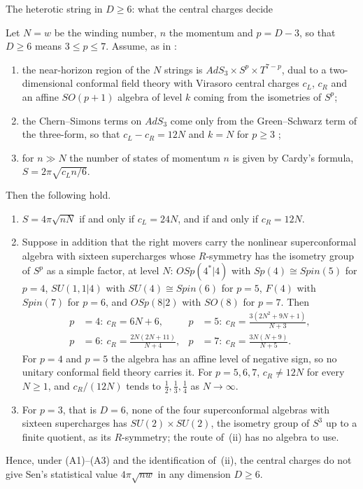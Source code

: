 \begin{closurebox}{The heterotic string in $D\ge6$: what the central charges decide}
\begin{theorem}\label{thm:centralcharge}
Let $N=w$ be the winding number, $n$ the momentum and $p=D-3$, so that $D\ge6$ means $3\le p\le7$. Assume, as in \cite{DM08,KLS07}:
\begin{enumerate}[label=\textup{(A\arabic*)},leftmargin=2.8em]
\item the near-horizon region of the $N$ strings is $AdS_3\times S^p\times T^{7-p}$, dual to a two-dimensional conformal field theory with Virasoro central charges $c_L$, $c_R$ and an affine $SO(p+1)$ algebra of level $k$ coming from the isometries of $S^p$;
\item the Chern--Simons terms on $AdS_3$ come only from the Green--Schwarz term of the three-form, so that $c_L-c_R=12N$ and $k=N$ for $p\ge3$ \cite[Eq.~(3.12)]{KLS07};
\item for $n\gg N$ the number of states of momentum $n$ is given by Cardy's formula, $S=2\pi\sqrt{c_Ln/6}$.
\end{enumerate}
Then the following hold.
\begin{enumerate}[label=\textup{(\roman*)},leftmargin=2em]
\item $S=4\pi\sqrt{nN}$ if and only if $c_L=24N$, and if and only if $c_R=12N$.
\item Suppose in addition that the right movers carry the nonlinear superconformal algebra with sixteen supercharges whose $R$-symmetry has the isometry group of $S^p$ as a simple factor, at level $N$: $OSp(4^*|4)$ with $Sp(4)\cong Spin(5)$ for $p=4$, $SU(1,1|4)$ with $SU(4)\cong Spin(6)$ for $p=5$, $F(4)$ with $Spin(7)$ for $p=6$, and $OSp(8|2)$ with $SO(8)$ for $p=7$. Then
\[
\begin{aligned}
p&=4:\ c_R=6N+6, & p&=5:\ c_R=\frac{3(2N^2+9N+1)}{N+3},\\
p&=6:\ c_R=\frac{2N(2N+11)}{N+4}, & p&=7:\ c_R=\frac{3N(N+9)}{N+5}.
\end{aligned}
\]
For $p=4$ and $p=5$ the algebra has an affine level of negative sign, so no unitary conformal field theory carries it. For $p=5,6,7$, $c_R\ne12N$ for every $N\ge1$, and $c_R/(12N)$ tends to $\tfrac12,\tfrac13,\tfrac14$ as $N\to\infty$.
\item For $p=3$, that is $D=6$, none of the four superconformal algebras with sixteen supercharges has $SU(2)\times SU(2)$, the isometry group of $S^3$ up to a finite quotient, as its $R$-symmetry; the route of~(ii) has no algebra to use.
\end{enumerate}
Hence, under \textup{(A1)}--\textup{(A3)} and the identification of~(ii), the central charges do not give Sen's statistical value $4\pi\sqrt{nw}$ in any dimension $D\ge6$.
\end{theorem}


\end{closurebox}
